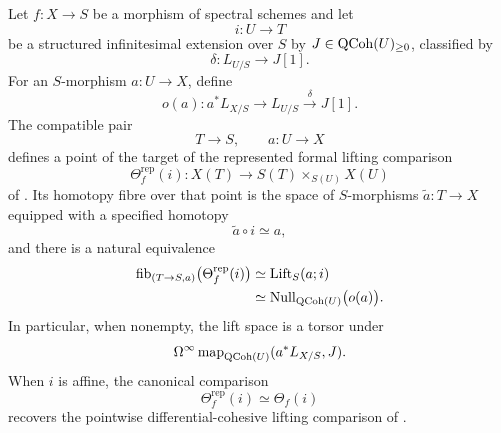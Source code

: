 \begin{theorem}
\label{thm:global-lifting-judgment}
Let \(f:X\to S\) be a morphism of spectral schemes and let
\[
    i:U\longrightarrow T
\]
be a structured infinitesimal extension over \(S\) by
\(J\in\operatorname{QCoh}(U)_{\geq0}\), classified by
\[
    \delta:L_{U/S}\longrightarrow J[1].
\]
For an \(S\)-morphism \(a:U\to X\), define
\[
    o(a):
    a^*L_{X/S}
    \longrightarrow
    L_{U/S}
    \xrightarrow{\delta}
    J[1].
\]
The compatible pair
\[
    T\longrightarrow S,
    \qquad
    a:U\longrightarrow X
\]
defines a point of the target of the represented formal lifting comparison
\[
    \Theta_f^{\mathrm{rep}}(i):
    X(T)
    \longrightarrow
    S(T)\times_{S(U)}X(U)
\]
of . Its homotopy fibre over
that point is the space of \(S\)-morphisms
\(\widetilde a:T\to X\) equipped with a specified homotopy
\[
    \widetilde a\circ i\simeq a,
\]
and there is a natural equivalence
\[
\begin{aligned}
    \operatorname{fib}_{(T\to S,a)}
    \bigl(\Theta_f^{\mathrm{rep}}(i)\bigr)
    &\simeq
    \operatorname{Lift}_S(a;i)
    \\
    &\simeq
    \operatorname{Null}_{\operatorname{QCoh}(U)}\bigl(o(a)\bigr).
\end{aligned}
\]
In particular, when nonempty, the lift space is a torsor under
\[
    \Omega^\infty
    \operatorname{map}_{\operatorname{QCoh}(U)}(a^*L_{X/S},J).
\]
When \(i\) is affine, the canonical comparison
\[
    \Theta_f^{\mathrm{rep}}(i)\simeq\Theta_f(i)
\]
recovers the pointwise differential-cohesive lifting comparison of
.
\end{theorem}

